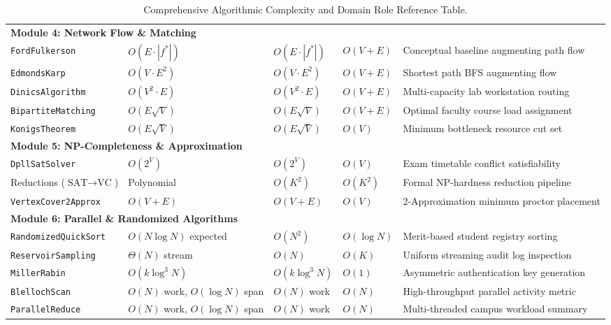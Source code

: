 \begin{table}[H]
\begin{tabularx}{\textwidth}{llllp{4.2cm}}
\midrule
\multicolumn{5}{l}{\textbf{Module 4: Network Flow \& Matching}} \\
\texttt{FordFulkerson} & $O(E \cdot |f^*|)$ & $O(E \cdot |f^*|)$ & $O(V + E)$ & Conceptual baseline augmenting path flow \\
\texttt{EdmondsKarp} & $O(V \cdot E^2)$ & $O(V \cdot E^2)$ & $O(V + E)$ & Shortest path BFS augmenting flow \\
\texttt{DinicsAlgorithm} & $O(V^2 \cdot E)$ & $O(V^2 \cdot E)$ & $O(V + E)$ & Multi-capacity lab workstation routing \\
\texttt{BipartiteMatching} & $O(E \sqrt{V})$ & $O(E \sqrt{V})$ & $O(V + E)$ & Optimal faculty course load assignment \\
\texttt{KonigsTheorem} & $O(E \sqrt{V})$ & $O(E \sqrt{V})$ & $O(V)$ & Minimum bottleneck resource cut set \\
\midrule
\multicolumn{5}{l}{\textbf{Module 5: NP-Completeness \& Approximation}} \\
\texttt{DpllSatSolver} & $O(2^V)$ & $O(2^V)$ & $O(V)$ & Exam timetable conflict satisfiability \\
Reductions ($\text{SAT} \to \text{VC}$) & Polynomial & $O(K^2)$ & $O(K^2)$ & Formal NP-hardness reduction pipeline \\
\texttt{VertexCover2Approx} & $O(V + E)$ & $O(V + E)$ & $O(V)$ & 2-Approximation minimum proctor placement \\
\midrule
\multicolumn{5}{l}{\textbf{Module 6: Parallel \& Randomized Algorithms}} \\
\texttt{RandomizedQuickSort} & $O(N \log N)$ expected & $O(N^2)$ & $O(\log N)$ & Merit-based student registry sorting \\
\texttt{ReservoirSampling} & $\Theta(N)$ stream & $O(N)$ & $O(K)$ & Uniform streaming audit log inspection \\
\texttt{MillerRabin} & $O(k \log^3 N)$ & $O(k \log^3 N)$ & $O(1)$ & Asymmetric authentication key generation \\
\texttt{BlellochScan} & $O(N)$ work, $O(\log N)$ span & $O(N)$ work & $O(N)$ & High-throughput parallel activity metric \\
\texttt{ParallelReduce} & $O(N)$ work, $O(\log N)$ span & $O(N)$ work & $O(N)$ & Multi-threaded campus workload summary \\
\bottomrule
\end{tabularx}
\caption{Comprehensive Algorithmic Complexity and Domain Role Reference Table.}
\label{tab:master_complexity}
\end{table}

